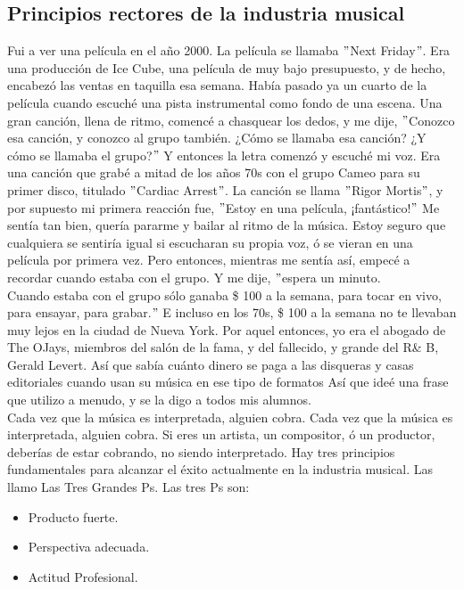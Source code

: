 \documentclass[10pt]{book}
\begin{document}
\subsection{Principios rectores de la industria musical}
Fui a ver una película en el año 2000. La película se llamaba $"$Next Friday$"$. Era una producción de Ice Cube, una película de muy bajo presupuesto, y de hecho, encabezó las ventas en taquilla esa semana. Había pasado ya un cuarto de la película cuando escuché una pista instrumental como fondo de una escena. Una gran canción, llena de ritmo, comencé a chasquear los dedos, y me dije, $"$Conozco esa canción,  y conozco al grupo también. ¿Cómo se llamaba esa canción? ¿Y cómo se llamaba el grupo?$"$ Y entonces la letra comenzó y escuché mi voz. Era una canción que grabé a mitad de los años 70s con el grupo Cameo para su primer disco, titulado $"$Cardiac Arrest$"$. La canción se llama $"$Rigor Mortis$"$, y por supuesto mi primera reacción fue,  $"$Estoy en una película, ¡fantástico!$"$ Me sentía tan bien, quería pararme  y bailar al ritmo de la música. Estoy seguro que cualquiera se sentiría igual  si escucharan su propia voz, ó se vieran en una película por primera vez. Pero entonces, mientras me sentía así, empecé a recordar cuando estaba con el grupo. Y me dije, $"$espera un minuto.\\ 
Cuando estaba con el grupo sólo ganaba \$ 100 a la semana, para tocar en vivo, para ensayar, para grabar.$"$ E incluso en los 70s, \$ 100 a la semana  no te llevaban muy lejos en la ciudad de Nueva York. Por aquel entonces, yo era el abogado de The OJays, miembros del salón de la fama,  y del fallecido, y grande del R\& B, Gerald Levert. Así que sabía cuánto dinero se paga a las disqueras y casas editoriales cuando usan su música  en ese tipo de formatos Así que ideé una frase que utilizo a menudo, y se la digo a todos mis alumnos.\\ 
Cada vez que la música es interpretada, alguien cobra. Cada vez que la música es interpretada, alguien cobra. Si eres un artista, un compositor, ó un productor, deberías de estar cobrando,  no siendo interpretado. Hay tres principios fundamentales para alcanzar el éxito actualmente en la industria musical. Las llamo Las Tres Grandes Ps. Las tres Ps son: 
\begin{itemize}
\item Producto fuerte.
\item Perspectiva adecuada.
\item Actitud Profesional.
\end{itemize}
\end{document}
